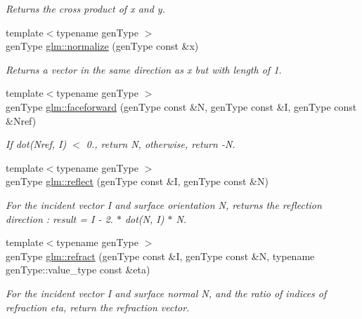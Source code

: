 \begin{DoxyCompactItemize}
\begin{DoxyCompactList}\small\item\em Returns the cross product of x and y. \end{DoxyCompactList}\item 
{\footnotesize template$<$typename gen\-Type $>$ }\\gen\-Type \hyperlink{group__core__func__geometric_ga68b931c228750eeba844c273c54ca43d}{glm\-::normalize} (gen\-Type const \&x)
\begin{DoxyCompactList}\small\item\em Returns a vector in the same direction as x but with length of 1. \end{DoxyCompactList}\item 
{\footnotesize template$<$typename gen\-Type $>$ }\\gen\-Type \hyperlink{group__core__func__geometric_ga855fc5fd7779df1683482564956c6764}{glm\-::faceforward} (gen\-Type const \&N, gen\-Type const \&I, gen\-Type const \&Nref)
\begin{DoxyCompactList}\small\item\em If dot(\-Nref, I) $<$ 0., return N, otherwise, return -\/\-N. \end{DoxyCompactList}\item 
{\footnotesize template$<$typename gen\-Type $>$ }\\gen\-Type \hyperlink{group__core__func__geometric_gabe1fa0bef5f854242eb70ce56e5a7d03}{glm\-::reflect} (gen\-Type const \&I, gen\-Type const \&N)
\begin{DoxyCompactList}\small\item\em For the incident vector I and surface orientation N, returns the reflection direction \-: result = I -\/ 2. $\ast$ dot(\-N, I) $\ast$ N. \end{DoxyCompactList}\item 
{\footnotesize template$<$typename gen\-Type $>$ }\\gen\-Type \hyperlink{group__core__func__geometric_gabbb4909d3e99a7a2411cc63252afbbd8}{glm\-::refract} (gen\-Type const \&I, gen\-Type const \&N, typename gen\-Type\-::value\-\_\-type const \&eta)
\begin{DoxyCompactList}\small\item\em For the incident vector I and surface normal N, and the ratio of indices of refraction eta, return the refraction vector. \end{DoxyCompactList}\end{DoxyCompactItemize}


